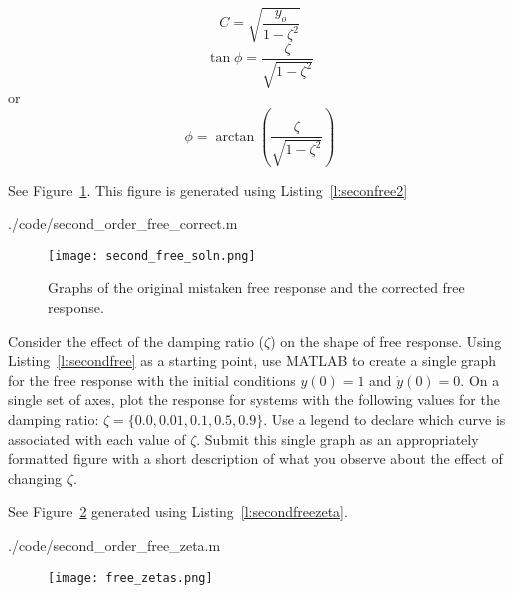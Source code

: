 \ifsolutions
\begin{soln}
\[ C = \sqrt{\frac{y_o}{1-\zeta^2}} \]
\[ \tan\phi = \frac{\zeta}{\sqrt{1-\zeta^2}} \]
or 
\[ \phi = \arctan\left(\frac{\zeta}{\sqrt{1-\zeta^2}}\right) \]

See Figure~\ref{f:secondfreesoln}.  This figure is generated using Listing~\ref{l:seconfree2}


{./code/second_order_free_correct.m}

\begin{figure}[hbt]
\centering
\texttt{[image: second\_free\_soln.png]}
\caption{Graphs of the original mistaken free response and the corrected free response.}
\label{f:secondfreesoln}
\end{figure}
\end{soln}
\fi

\begin{ex}
Consider the effect of the damping ratio ($\zeta$) on the shape of free response.  Using Listing~\ref{l:secondfree} as a starting point, use MATLAB to create a single graph for the free response with the initial conditions $y(0)=1$ and $\dot{y}(0)=0$.  On a single set of axes, plot the response for systems with the following values for the damping ratio: $\zeta=\{0.0, 0.01 , 0.1, 0.5, 0.9\}$.  Use a legend to declare which curve is associated with each value of $\zeta$.  Submit this single graph as an appropriately formatted figure with a short description of what you observe about the effect of changing $\zeta$.
\end{ex}

\ifsolutions
\begin{soln}
See Figure~\ref{f:secondfreezetas} generated using Listing~\ref{l:secondfreezeta}.


{./code/second_order_free_zeta.m}


\begin{figure}[hbt]
\centering
\texttt{[image: free\_zetas.png]}
\caption{}
\label{f:secondfreezetas}
\end{figure}

\end{soln}
\fi

